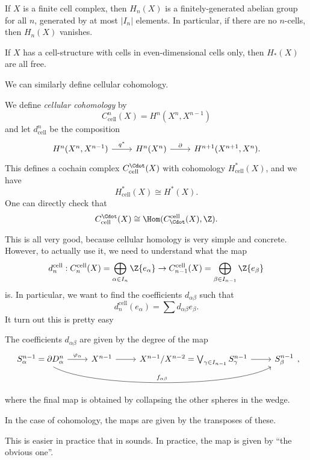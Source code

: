 \documentclass[a4paper]{article}
\theoremstyle{definition}
\begin{document}
\begin{cor}
  If $X$ is a finite cell complex, then $H_n(X)$ is a finitely-generated abelian group for all $n$, generated by at most $|I_n|$ elements. In particular, if there are no $n$-cells, then $H_n(X)$ vanishes.

  If $X$ has a cell-structure with cells in even-dimensional cells only, then $H_*(X)$ are all free.
\end{cor}

We can similarly define cellular cohomology.
\begin{defi}
  We define \emph{cellular cohomology} by
  \[
    C_{\mathrm{cell}}^n(X) = H^n(X^n, X^{n - 1})
  \]
  and let $d_{\mathrm{cell}}^n$ be the composition
  \[
    \begin{tikzcd}
      H^n(X^n, X^{n - 1}) \ar[r, "q^*"] & H^n(X^n) \ar[r, "\partial"] & H^{n + 1}(X^{n + 1}, X^n).
    \end{tikzcd}
  \]
  This defines a cochain complex $C_{\mathrm{cell}}^\Cdot(X)$ with cohomology $H^*_{\mathrm{cell}}(X)$, and we have
  \[
    H_{\mathrm{cell}}^*(X) \cong H^*(X).
  \]
  One can directly check that
  \[
    C_{\mathrm{cell}}^\Cdot(X) \cong \Hom (C_\Cdot^{\mathrm{cell}}(X), \Z).
  \]
\end{defi}

This is all very good, because cellular homology is very simple and concrete. However, to actually use it, we need to understand what the map
\[
  d_n^{\mathrm{cell}} : C_n^{\mathrm{cell}}(X) = \bigoplus_{\alpha \in I_n} \Z\{e_\alpha\} \to C_{n - 1}^{\mathrm{cell}}(X) = \bigoplus_{\beta \in I_{n - 1}}\Z\{e_\beta\}
\]
is. In particular, we want to find the coefficients $d_{\alpha\beta}$ such that
\[
  d_n^{\mathrm{cell}}(e_\alpha) = \sum d_{\alpha\beta} e_\beta.
\]
It turn out this is pretty easy
\begin{lemma}
  The coefficients $d_{\alpha\beta}$ are given by the degree of the map
  \[
    \begin{tikzcd}
      S_\alpha^{n - 1} = \partial D_\alpha^n \ar[r, "\varphi_\alpha"] \ar[rrr, bend right, "f_{\alpha\beta}", looseness=0.5] & X^{n - 1} \ar[r] & X^{n - 1}/X^{n - 2} = \bigvee_{\gamma \in I_{n - 1}} S_\gamma^{n - 1} \ar[r] & S_\beta^{n - 1}
    \end{tikzcd},
  \]
  where the final map is obtained by collapsing the other spheres in the wedge.

  In the case of cohomology, the maps are given by the transposes of these.
\end{lemma}
This is easier in practice that in sounds. In practice, the map is given by ``the obvious one''.
\end{document}
